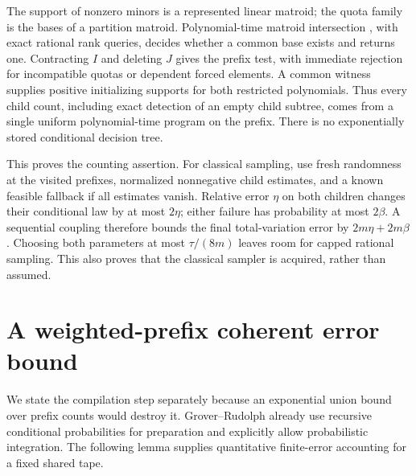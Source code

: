 \documentclass[11pt]{article}
\theoremstyle{remark}
\begin{document}
The support of nonzero minors is a represented linear matroid; the quota family is the bases of a partition matroid. Polynomial-time matroid intersection \cite{Edmonds}, with exact rational rank queries, decides whether a common base exists and returns one. Contracting $I$ and deleting $J$ gives the prefix test, with immediate rejection for incompatible quotas or dependent forced elements. A common witness supplies positive initializing supports for both restricted polynomials. Thus every child count, including exact detection of an empty child subtree, comes from a single uniform polynomial-time program on the prefix. There is no exponentially stored conditional decision tree.

This proves the counting assertion. For classical sampling, use fresh randomness at the visited prefixes, normalized nonnegative child estimates, and a known feasible fallback if all estimates vanish. Relative error $\eta$ on both children changes their conditional law by at most $2\eta$; either failure has probability at most $2\beta$. A sequential coupling therefore bounds the final total-variation error by $2m\eta+2m\beta$. Choosing both parameters at most $\tau/(8m)$ leaves room for capped rational sampling. This also proves that the classical sampler is acquired, rather than assumed.

\section{A weighted-prefix coherent error bound}
We state the compilation step separately because an exponential union bound over prefix counts would destroy it. Grover--Rudolph \cite{GR} already use recursive conditional probabilities for preparation and explicitly allow probabilistic integration. The following lemma supplies quantitative finite-error accounting for a fixed shared tape.
\end{document}
